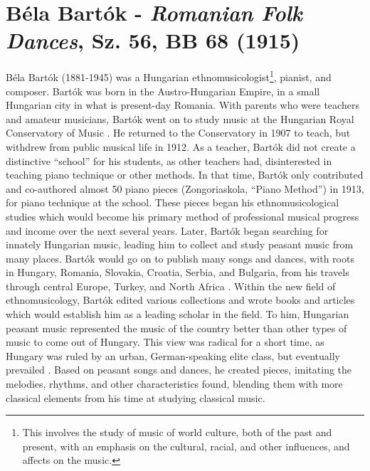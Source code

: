 \chapter[Bartók's \textit{Romanian Folk Dances}, Sz. 56, BB 68]{Béla Bartók - \textit{Romanian Folk Dances}, Sz. 56, BB 68 (1915)}

Béla Bartók (1881-1945) was a Hungarian ethnomusicologist\footnote{This involves the study of music of world culture, both of the past and present, with an emphasis on the cultural, racial, and other influences, and affects on the music.}, pianist, and composer. Bartók was born in the Austro-Hungarian Empire, in a small Hungarian city in what is present-day Romania. With parents who were teachers and amateur musicians, Bartók went on to study music at the Hungarian Royal Conservatory of Music \autocite{Burkholder_Grout_Palisca_2014}. He returned to the Conservatory in 1907 to teach, but withdrew from public musical life in 1912\autocite{Gillies}. As a teacher, Bartók did not create a distinctive ``school'' for his students, as other teachers had, disinterested in teaching piano technique or other methods. In that time, Bartók only contributed and co-authored almost 50 piano pieces (Zongoriaskola, ``Piano Method'') in 1913, for piano technique at the school\autocite{Gillies}. These pieces began his ethnomusicological studies which would become his primary method of professional musical progress and income over the next several years. Later, Bartók began searching for innately Hungarian music, leading him to collect and study peasant music from many places. Bartók would go on to publish many songs and dances, with roots in Hungary, Romania, Slovakia, Croatia, Serbia, and Bulgaria, from his travels through central Europe, Turkey, and North Africa \autocite{Burkholder_Grout_Palisca_2014}. Within the new field of ethnomusicology, Bartók edited various collections and wrote books and articles which would establish him as a leading scholar in the field. To him, Hungarian peasant music represented the music of the country better than other types of music to come out of Hungary. This view was radical for a short time, as Hungary was ruled by an urban, German-speaking elite class, but eventually prevailed \autocite{Burkholder_Grout_Palisca_2014}. Based on peasant songs and dances, he created pieces, imitating the melodies, rhythms, and other characteristics found, blending them with more classical elements from his time at studying classical music. 


